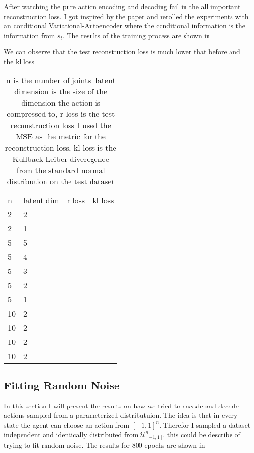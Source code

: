 After watching the pure action encoding and decoding fail in the all important reconstruction loss. I got inspired by the paper  and rerolled the experiments with an conditional Variational-Autoencoder where the conditional information is the information from $s_t$. 
The results of the training process are shown in \figref{}

We can observe that the test reconstruction loss is much lower that before and the kl loss

\begin{table}[]
    \centering
    \begin{tabular}{l|l|r|r}
         n & latent dim & r loss & kl loss\\
         2 & 2 & & \\
         2 & 1 & & \\
         5 & 5 & & \\
         5 & 4 & & \\
         5 & 3 & & \\
         5 & 2 & & \\
         5 & 1 & & \\
         10 & 2 & & \\
         10 & 2 & & \\
         10 & 2 & & \\
         10 & 2 & & \\
    \end{tabular}
    \caption{n is the number of joints, latent dimension is the size of the dimension the action is compressed to, r loss is the test reconstruction loss I used the MSE as the metric for the reconstruction loss, kl loss is the Kullback Leiber diveregence from the standard normal distribution on the test dataset}
    \label{tab:CVAE results}
\end{table}

\subsection{Fitting Random Noise}

In this section I will present the results on how we tried to encode and decode actions sampled from a parameterized distributuion.
The idea is that in every state the agent can choose an action from $[-1, 1]^n$. Therefor I sampled a dataset independent and identically distributed from $\mathcal{U}^n_{[-1, 1]}$. this could be describe of trying to fit random noise.
The results for 800 epochs are shown in \figref{}.



